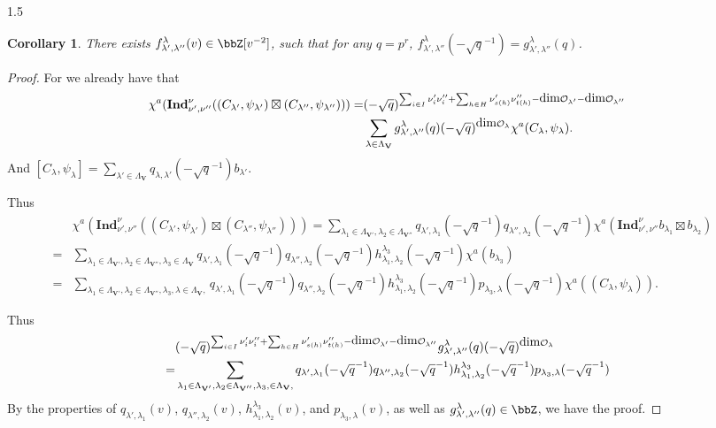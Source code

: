 \documentclass[10pt]{amsart}
\newtheorem{corollary}[theorem]{Corollary}
\def\dim{\mbox{\rm dim}}   \def\End{\mbox{\rm End}}
\def\bfV{{\mathbf V}}
\def\bfV{\mathbf{V}}
\def\Ind{\mathbf{Ind}}
\newcommand\mo{{\mathcal{O}}}
\begin{document}
\begin{spacing}{1.5}
\begin{corollary}\label{2}
   There exists $f_{\lambda',\lambda''}^{\lambda}(v)\in \bbZ[v^{-2}]$, such that for any $q=p^r$, $f_{\lambda',\lambda''}^{\lambda}(-\sqrt{q}^{-1})=g_{\lambda',\lambda''}^{\lambda}(q)$.
\end{corollary}
\begin{proof}
   For we already have that $$\begin{aligned}
       \chi^a(\Ind_{\nu',\nu''}^{\nu}((C_{\lambda'},\psi_{\lambda'})\boxtimes (C_{\lambda''},\psi_{\lambda''})))=&(-\sqrt{q})^{\sum_{i\in I}\nu_i'\nu_i''+\sum_{h\in H}\nu_{s(h)}'\nu_{t(h)}''-\dim\mo_{\lambda'}-\dim\mo_{\lambda''}}\\&\sum_{\lambda\in \Lambda_{\bfV}}g_{\lambda',\lambda''}^{\lambda}(q)(-\sqrt{q})^{\dim\mo_{\lambda}}\chi^a(C_{\lambda},\psi_{\lambda}).\end{aligned}$$
    And 
    $[C_{\lambda},\psi_{\lambda}]=\sum_{\lambda'\in \Lambda_{\bfV}}q_{\lambda,\lambda'}(-\sqrt{q}^{-1})b_{\lambda'}.$
    
    Thus
    $$\begin{aligned}   
    &\chi^a(\Ind_{\nu',\nu''}^{\nu}((C_{\lambda'},\psi_{\lambda'})\boxtimes (C_{\lambda''},\psi_{\lambda''})))=\sum_{\lambda_1\in \Lambda_{\bfV'},\lambda_2\in \Lambda_{\bfV''}}q_{\lambda',\lambda_1}(-\sqrt{q}^{-1})q_{\lambda'',\lambda_2}(-\sqrt{q}^{-1})\chi^a(\Ind_{\nu',\nu''}^{\nu}b_{\lambda_1}\boxtimes b_{\lambda_2})\\=&\sum_{\lambda_1\in \Lambda_{\bfV'},\lambda_2\in \Lambda_{\bfV''},\lambda_3\in \Lambda_{\bfV}}q_{\lambda',\lambda_1}(-\sqrt{q}^{-1})q_{\lambda'',\lambda_2}(-\sqrt{q}^{-1})h_{\lambda_1,\lambda_2}^{\lambda_3}(-\sqrt{q}^{-1})\chi^a(b_{\lambda_3})\\=&\sum_{\lambda_1\in \Lambda_{\bfV'},\lambda_2\in \Lambda_{\bfV''},\lambda_3,\lambda\in \Lambda_{\bfV}, }q_{\lambda',\lambda_1}(-\sqrt{q}^{-1})q_{\lambda'',\lambda_2}(-\sqrt{q}^{-1})h_{\lambda_1,\lambda_2}^{\lambda_3}(-\sqrt{q}^{-1})p_{\lambda_3,\lambda}(-\sqrt{q}^{-1})\chi^a((C_{\lambda},\psi_{\lambda})).&\end{aligned}$$

   Thus 
   $$\begin{aligned}      
  &(-\sqrt{q})^{\sum_{i\in I}\nu_i'\nu_i''+\sum_{h\in H}\nu_{s(h)}'\nu_{t(h)}''-\dim\mo_{\lambda'}-\dim\mo_{\lambda''}}g_{\lambda',\lambda''}^{\lambda}(q)(-\sqrt{q})^{\dim\mo_{\lambda}}\\=&\sum_{\lambda_1\in \Lambda_{\bfV'},\lambda_2\in \Lambda_{\bfV''},\lambda_3,\in \Lambda_{\bfV}, }q_{\lambda',\lambda_1}(-\sqrt{q}^{-1})q_{\lambda'',\lambda_2}(-\sqrt{q}^{-1})h_{\lambda_1,\lambda_2}^{\lambda_3}(-\sqrt{q}^{-1})p_{\lambda_3,\lambda}(-\sqrt{q}^{-1}) \end{aligned}$$
  By the properties of $q_{\lambda',\lambda_1}(v)$, $q_{\lambda'',\lambda_2}(v)$, $h_{\lambda_1,\lambda_2}^{\lambda_3}(v)$, and $p_{\lambda_3,\lambda}(v)$, as well as $g_{\lambda',\lambda''}^{\lambda}(q)\in \bbZ$, we have the proof.
\end{proof}

\end{spacing}
\end{document}
